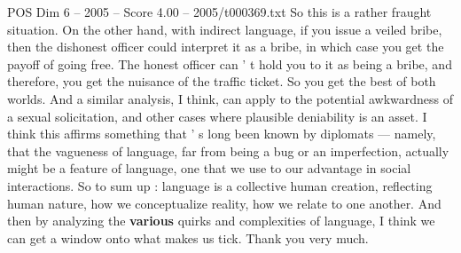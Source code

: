 \begin{textsample}{POS Dim 6 – 2005 – Score 4.00 – 2005/t000369.txt}
So this is a rather fraught situation.
On the other hand, with indirect language, if you issue a veiled bribe, then the dishonest officer could interpret it as a bribe, in which case you get the payoff of going free.
The honest officer can ' t hold you to it as being a bribe, and therefore, you get the nuisance of the traffic ticket.
So you get the best of both worlds.
And a similar analysis, I think, can apply to the potential awkwardness of a sexual solicitation, and other cases where plausible deniability is an asset.
I think this affirms something that ' s long been known by diplomats — namely, that the vagueness of language, far from being a bug or an imperfection, actually might be a feature of language, one that we use to our advantage in social interactions.
So to sum up : language is a collective human creation, reflecting human nature, how we conceptualize reality, how we relate to one another.
And then by analyzing the \textbf{various} quirks and complexities of language, I think we can get a window onto what makes us tick.
Thank you very much.

\end{textsample}
